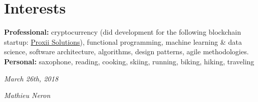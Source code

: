 \documentclass[]{friggeri-cv}
\begin{document}
\newpage


\section{Interests}

\textbf{Professional:} cryptocurrency (did development for the following blockchain startup: \href{https://proxiisolutions.com/}{Proxii Solutions}), functional programming, machine learning \& data science, software architecture, algorithms, design patterns, agile methodologies.
\\
\textbf{Personal:} saxophone, reading, cooking, skiing, running, biking, hiking, traveling
\\
\begin{flushleft}
\emph{March 26th, 2018}
\end{flushleft}
\begin{flushright}
\emph{Mathieu Neron}
\end{flushright}
\end{document}
